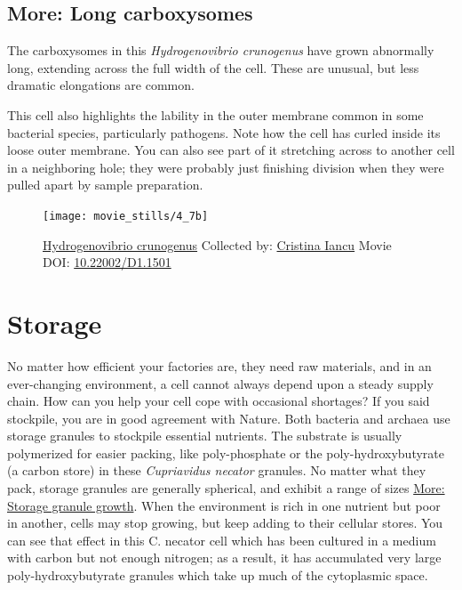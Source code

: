 \documentclass[]{tufte-book}
\begin{document}
\hypertarget{Long_carboxysomes}{\subsection*{More: Long
carboxysomes}\label{Long_carboxysomes}}

The carboxysomes in this \emph{Hydrogenovibrio crunogenus} have grown
abnormally long, extending across the full width of the cell. These are
unusual, but less dramatic elongations are common.

This cell also highlights the lability in the outer membrane common in
some bacterial species, particularly pathogens. Note how the cell has
curled inside its loose outer membrane. You can also see part of it
stretching across to another cell in a neighboring hole; they were
probably just finishing division when they were pulled apart by sample
preparation.





\begin{figure}
\texttt{[image: movie\_stills/4\_7b]} \caption[\protect\hyperlink{tree}{Hydrogenovibrio crunogenus}
Collected by: \protect\hyperlink{cristina_iancu}{Cristina Iancu} Movie
DOI: \href{https://doi.org/10.22002/D1.1501}{10.22002/D1.1501}]{\protect\hyperlink{tree}{Hydrogenovibrio crunogenus}
Collected by: \protect\hyperlink{cristina_iancu}{Cristina Iancu} Movie
DOI: \href{https://doi.org/10.22002/D1.1501}{10.22002/D1.1501}}\label{fig:4-7b}
\end{figure}

\section{Storage}\label{storage}

No matter how efficient your factories are, they need raw materials, and
in an ever-changing environment, a cell cannot always depend upon a
steady supply chain. How can you help your cell cope with occasional
shortages? If you said stockpile, you are in good agreement with Nature.
Both bacteria and archaea use storage granules to stockpile essential
nutrients. The substrate is usually polymerized for easier packing, like
poly-phosphate or the poly-hydroxybutyrate (a carbon store) in these
\emph{Cupriavidus necator} granules. No matter what they pack, storage
granules are generally spherical, and exhibit a range of sizes
\protect\hyperlink{Storage_granule_growth}{More: Storage granule
growth}. When the environment is rich in one nutrient but poor in
another, cells may stop growing, but keep adding to their cellular
stores. You can see that effect in this C. necator cell which has been
cultured in a medium with carbon but not enough nitrogen; as a result,
it has accumulated very large poly-hydroxybutyrate granules which take
up much of the cytoplasmic space.
\end{document}
